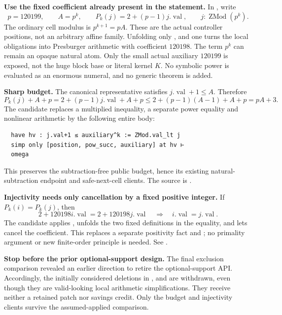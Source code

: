 \textbf{Use the fixed coefficient already present in the statement.} In
, write
\[
 p=120199,\qquad A=p^k,\qquad P_k(j)=2+(p-1)j.\operatorname{val},
 \qquad j:\operatorname{ZMod}(p^k).
\]
The ordinary cell modulus is $p^{k+1}=pA$. These are the actual controller positions, not an arbitrary affine family. Unfolding only ,  and one  turns the local obligations into Presburger arithmetic with coefficient $120198$. The term $p^k$ can remain an opaque natural atom. Only the small actual auxiliary $120199$ is exposed, not the huge block base or literal kernel $K$. No symbolic power is evaluated as an enormous numeral, and no generic theorem is added.

\textbf{Sharp budget.} The canonical representative satisfies $j.\operatorname{val}+1\le A$. Therefore
\[
 P_k(j)+A+p
 = 2+(p-1)j.\operatorname{val}+A+p
 \le 2+(p-1)(A-1)+A+p=pA+3.
\]
The candidate replaces a multiplied inequality, a separate power equality and nonlinear arithmetic by the following entire body:
\begin{lstlisting}
  have hv : j.val+1 ≤ auxiliary^k := ZMod.val_lt j
  simp only [position, pow_succ, auxiliary] at hv ⊢
  omega
\end{lstlisting}
This preserves the subtraction-free public budget, hence its existing natural-subtraction endpoint and safe-next-cell clients. The source is .

\textbf{Injectivity needs only cancellation by a fixed positive integer.} If $P_k(i)=P_k(j)$, then
\[
 2+120198i.\operatorname{val}=2+120198j.\operatorname{val}
 \quad\Longrightarrow\quad i.\operatorname{val}=j.\operatorname{val}.
\]
The candidate applies , unfolds the two fixed definitions in the equality, and lets  cancel the coefficient. This replaces a separate positivity fact and ; no primality argument or new finite-order principle is needed. See .

\textbf{Stop before the prior optional-support design.} The final exclusion comparison revealed an earlier direction to retire the optional-support API. Accordingly, the initially considered deletions in ,  and  are withdrawn, even though they are valid-looking local arithmetic simplifications. They receive neither a retained patch nor savings credit. Only the budget and injectivity clients survive the assumed-applied comparison.

